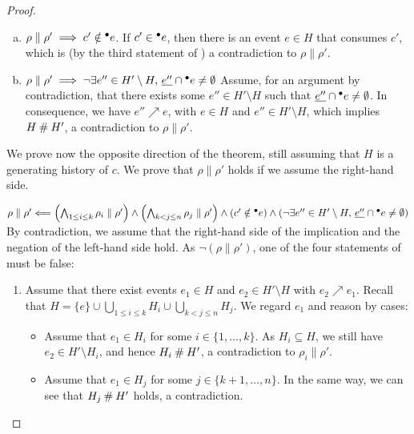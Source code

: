 \documentclass[12pt,a4paper]{article}
\newcommand{\confl}{\ensuremath\mathbin\#}
\begin{document}
\begin{proof}
\begin{enumerate}[(a)]
\item $\rho \parallel \rho' \implies c' \notin {}^\bullet e$.  If $c' \in {}^\bullet e$,
then there is an event $e \in H$ that consumes $c'$, which is (by the third
statement of ) a contradiction to $\rho \parallel \rho'$.

\item $\rho \parallel \rho' \implies \lnot \exists e'' \in H' \setminus
H,\, \underline{e''} \cap {}^\bullet e \ne \emptyset$  Assume, for an argument by
contradiction, that there exists some $e'' \in H' \setminus H$
such that $\underline{e''} \cap {}^\bullet e \ne \emptyset$.  In consequence, we have
$e'' \nearrow e$, with $e \in H$ and $e'' \in H' \setminus H$, which implies $H
\confl H'$, a contradiction to $\rho \parallel \rho'$.
\end{enumerate}

We prove now the opposite direction of the theorem, still assuming that $H$ is
a generating history of $c$.  We prove that $\rho \parallel \rho'$ holds if we
assume the right-hand side.

\item $\rho \parallel \rho' \Longleftarrow
\left ( \bigwedge_{1 \le i \le k} \rho_i \parallel \rho' \right ) \land 
\left ( \bigwedge_{k < j \le n} \rho_j \parallel \rho' \right ) \land 
\left ( c' \notin {}^\bullet e \right ) \land
\left ( \lnot \exists e'' \in H' \setminus H,\, \underline{e''} \cap {}^\bullet e \ne
\emptyset \right )$ By contradiction, we assume that the right-hand side of the
implication and the negation of the left-hand side hold.  As $\lnot (\rho
\parallel \rho')$, one of the four statements of  must be
false:

\begin{enumerate}[$i$.]
\item Assume that there exist events $e_1 \in H$ and $e_2 \in H' \setminus H$
with $e_2 \nearrow e_1$.  Recall that $H = \{e\} \cup \bigcup_{1 \le i \le k}
H_i \cup \bigcup_{k < j \le n} H_j$.  We regard $e_1$ and reason by cases:

\begin{itemize}
\item Assume that $e_1 \in H_i$ for some $i \in \{1, \ldots, k\}$. As $H_i
\subseteq H$, we still have $e_2 \in H' \setminus H_i$, and hence $H_i \confl
H'$, a contradiction to $\rho_i \parallel \rho'$.

\item Assume that $e_1 \in H_j$ for some $j \in \{k+1, \ldots, n\}$.  In
the same way, we can see that $H_j \confl H'$ holds, a contradiction.


\end{itemize}
\end{enumerate}
\end{proof}
\end{document}
